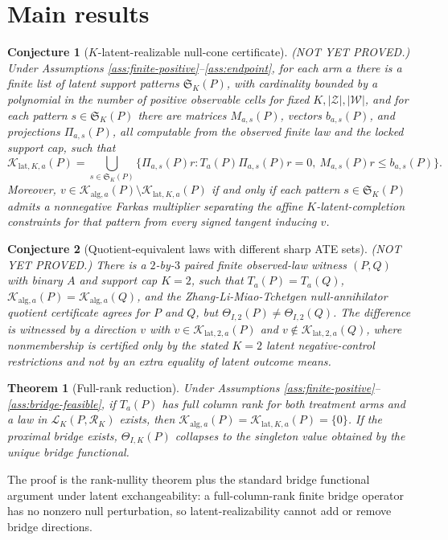 \documentclass[11pt]{article}
\theoremstyle{definition}
\theoremstyle{plain}
\newtheorem{theorem}{Theorem}
\newtheorem{conjecture}{Conjecture}
\theoremstyle{remark}
\begin{document}
\section{Main results}
\begin{conjecture}[\(K\)-latent-realizable null-cone certificate]\label{conj:null-cone}
(NOT YET PROVED.) Under Assumptions \ref{ass:finite-positive}--\ref{ass:endpoint}, for each arm \(a\) there is a finite list of latent support patterns \(\mathfrak S_K(P)\), with cardinality bounded by a polynomial in the number of positive observable cells for fixed \(K,|\mathcal Z|,|\mathcal W|\), and for each pattern \(s\in\mathfrak S_K(P)\) there are matrices \(M_{a,s}(P)\), vectors \(b_{a,s}(P)\), and projections \(\Pi_{a,s}(P)\), all computable from the observed finite law and the locked support cap, such that
\[
\mathcal K_{\mathrm{lat},K,a}(P)
=\bigcup_{s\in\mathfrak S_K(P)}
\{\Pi_{a,s}(P)r:T_a(P)\Pi_{a,s}(P)r=0,\ M_{a,s}(P)r\le b_{a,s}(P)\}.
\]
Moreover, \(v\in\mathcal K_{\mathrm{alg},a}(P)\setminus\mathcal K_{\mathrm{lat},K,a}(P)\) if and only if each pattern \(s\in\mathfrak S_K(P)\) admits a nonnegative Farkas multiplier separating the affine \(K\)-latent-completion constraints for that pattern from every signed tangent inducing \(v\).
\end{conjecture}

\begin{conjecture}[Quotient-equivalent laws with different sharp ATE sets]\label{conj:non-equivalence}
(NOT YET PROVED.) There is a \(2\)-by-\(3\) paired finite observed-law witness \((P,Q)\) with binary \(A\) and support cap \(K=2\), such that \(T_a(P)=T_a(Q)\), \(\mathcal K_{\mathrm{alg},a}(P)=\mathcal K_{\mathrm{alg},a}(Q)\), and the Zhang-Li-Miao-Tchetgen null-annihilator quotient certificate agrees for \(P\) and \(Q\), but \(\Theta_{I,2}(P)\ne\Theta_{I,2}(Q)\). The difference is witnessed by a direction \(v\) with \(v\in\mathcal K_{\mathrm{lat},2,a}(P)\) and \(v\notin\mathcal K_{\mathrm{lat},2,a}(Q)\), where nonmembership is certified only by the stated \(K=2\) latent negative-control restrictions and not by an extra equality of latent outcome means.
\end{conjecture}

\begin{theorem}[Full-rank reduction]\label{thm:full-rank}
Under Assumptions \ref{ass:finite-positive}--\ref{ass:bridge-feasible}, if \(T_a(P)\) has full column rank for both treatment arms and a law in \(\mathcal L_K(P,\mathcal R_K)\) exists, then \(\mathcal K_{\mathrm{alg},a}(P)=\mathcal K_{\mathrm{lat},K,a}(P)=\{0\}\). If the proximal bridge exists, \(\Theta_{I,K}(P)\) collapses to the singleton value obtained by the unique bridge functional.
\end{theorem}
The proof is the rank-nullity theorem plus the standard bridge functional argument under latent exchangeability: a full-column-rank finite bridge operator has no nonzero null perturbation, so latent-realizability cannot add or remove bridge directions.
\end{document}
